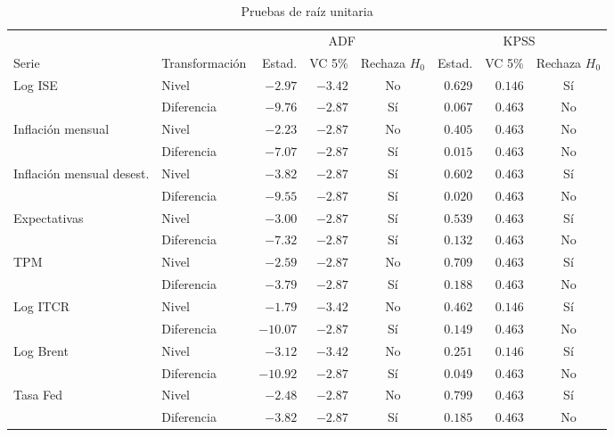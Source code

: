 \begin{table}[H]
\centering
\caption{Pruebas de raíz unitaria}
\label{tab:raices}
\footnotesize
\begin{tabular}{@{}llrrcrrc@{}}
\toprule
 & & \multicolumn{3}{c}{ADF} & \multicolumn{3}{c}{KPSS} \\
\cmidrule(lr){3-5}\cmidrule(l){6-8}
Serie & Transformación & Estad. & VC 5\% & Rechaza $H_0$ & Estad. & VC 5\% & Rechaza $H_0$ \\
\midrule
Log ISE & Nivel & $-2.97$ & $-3.42$ & No & $0.629$ & $0.146$ & Sí \\
 & Diferencia & $-9.76$ & $-2.87$ & Sí & $0.067$ & $0.463$ & No \\
Inflación mensual & Nivel & $-2.23$ & $-2.87$ & No & $0.405$ & $0.463$ & No \\
 & Diferencia & $-7.07$ & $-2.87$ & Sí & $0.015$ & $0.463$ & No \\
Inflación mensual desest. & Nivel & $-3.82$ & $-2.87$ & Sí & $0.602$ & $0.463$ & Sí \\
 & Diferencia & $-9.55$ & $-2.87$ & Sí & $0.020$ & $0.463$ & No \\
Expectativas & Nivel & $-3.00$ & $-2.87$ & Sí & $0.539$ & $0.463$ & Sí \\
 & Diferencia & $-7.32$ & $-2.87$ & Sí & $0.132$ & $0.463$ & No \\
TPM & Nivel & $-2.59$ & $-2.87$ & No & $0.709$ & $0.463$ & Sí \\
 & Diferencia & $-3.79$ & $-2.87$ & Sí & $0.188$ & $0.463$ & No \\
Log ITCR & Nivel & $-1.79$ & $-3.42$ & No & $0.462$ & $0.146$ & Sí \\
 & Diferencia & $-10.07$ & $-2.87$ & Sí & $0.149$ & $0.463$ & No \\
Log Brent & Nivel & $-3.12$ & $-3.42$ & No & $0.251$ & $0.146$ & Sí \\
 & Diferencia & $-10.92$ & $-2.87$ & Sí & $0.049$ & $0.463$ & No \\
Tasa Fed & Nivel & $-2.48$ & $-2.87$ & No & $0.799$ & $0.463$ & Sí \\
 & Diferencia & $-3.82$ & $-2.87$ & Sí & $0.185$ & $0.463$ & No \\
\bottomrule
\end{tabular}
\end{table}
